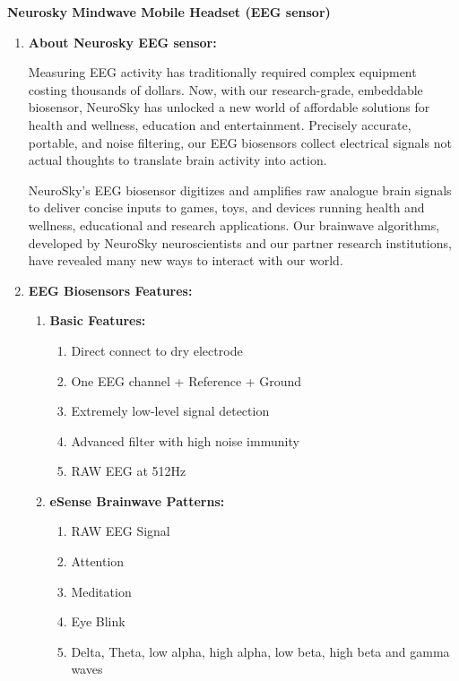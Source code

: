 \documentclass[12pt]{article}
\author{Omkar Mohite}
\title{}
\begin{document}
\begin{center}
\textbf{{\LARGE Neurosky Mindwave Mobile Headset (EEG sensor)}}
\end{center}

\begin{enumerate}
	\item \textbf{{\large About Neurosky EEG sensor:}}

Measuring EEG activity has traditionally required complex equipment costing thousands of dollars. Now, with our research-grade, embeddable biosensor, NeuroSky has unlocked a new world of affordable solutions for health and wellness, education and entertainment. Precisely accurate, portable, and noise filtering, our EEG biosensors collect electrical signals not actual thoughts to translate brain activity into action.

NeuroSky’s EEG biosensor digitizes and amplifies raw analogue brain signals to deliver concise inputs to games, toys, and devices running health and wellness, educational and research applications. Our brainwave algorithms, developed by NeuroSky neuroscientists and our partner research institutions, have revealed many new ways to interact with our world.


	\item \textbf{{\large EEG Biosensors Features:}}

\begin{enumerate}
	\item \textbf{Basic Features: }
\begin{enumerate}
	\item Direct connect to dry electrode
	\item One EEG channel + Reference + Ground
	\item Extremely low-level signal detection
	\item Advanced filter with high noise immunity
	\item RAW EEG at 512Hz
\end{enumerate}


	\item \textbf{eSense Brainwave Patterns:}


\begin{enumerate}
	\item RAW EEG Signal
	\item Attention
	\item Meditation
	\item Eye Blink
	\item Delta, Theta, low alpha, high alpha, low beta, high beta and gamma waves
\end{enumerate}



\end{enumerate}
\end{enumerate}
\end{document}
